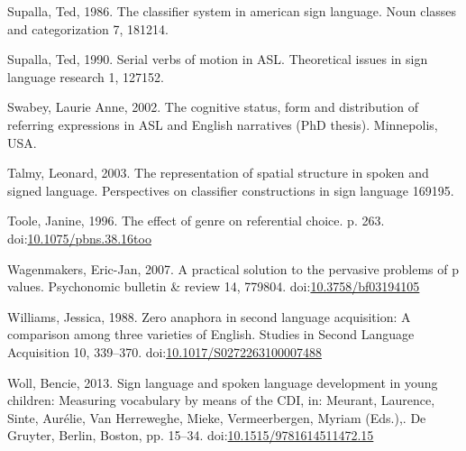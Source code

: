 \documentclass[]{elsarticle} %
\newlength{\cslhangindent}
\newenvironment{CSLReferences}[2] %
 {%
  \setlength{\parindent}{0pt}
  \ifodd #1 \everypar{\setlength{\hangindent}{\cslhangindent}}\ignorespaces\fi
  \ifnum #2 > 0
  \setlength{\parskip}{#2\baselineskip}
  \fi
 }%
 {}
\begin{document}
\begin{CSLReferences}{1}{0}
\leavevmode{}%
Supalla, Ted, 1986. The classifier system in american sign language.
Noun classes and categorization 7, 181214.

\leavevmode{}%
Supalla, Ted, 1990. Serial verbs of motion in ASL. Theoretical issues in
sign language research 1, 127152.

\leavevmode{}%
Swabey, Laurie Anne, 2002. The cognitive status, form and distribution
of referring expressions in ASL and English narratives (PhD thesis).
Minnepolis, USA.

\leavevmode{}%
Talmy, Leonard, 2003. The representation of spatial structure in spoken
and signed language. Perspectives on classifier constructions in sign
language 169195.

\leavevmode{}%
Toole, Janine, 1996. The effect of genre on referential choice. p. 263.
doi:\href{https://doi.org/10.1075/pbns.38.16too}{10.1075/pbns.38.16too}

\leavevmode{}%
Wagenmakers, Eric-Jan, 2007. A practical solution to the pervasive
problems of p values. Psychonomic bulletin \& review 14, 779804.
doi:\href{https://doi.org/10.3758/bf03194105}{10.3758/bf03194105}

\leavevmode{}%
Williams, Jessica, 1988. Zero anaphora in second language acquisition: A
comparison among three varieties of English. Studies in Second Language
Acquisition 10, 339--370.
doi:\href{https://doi.org/10.1017/S0272263100007488}{10.1017/S0272263100007488}

\leavevmode{}%
Woll, Bencie, 2013. Sign language and spoken language development in
young children: Measuring vocabulary by means of the CDI, in: Meurant,
Laurence, Sinte, Aurélie, Van Herreweghe, Mieke, Vermeerbergen, Myriam
(Eds.),. De Gruyter, Berlin, Boston, pp. 15--34.
doi:\href{https://doi.org/10.1515/9781614511472.15}{10.1515/9781614511472.15}

\end{CSLReferences}
\end{document}
